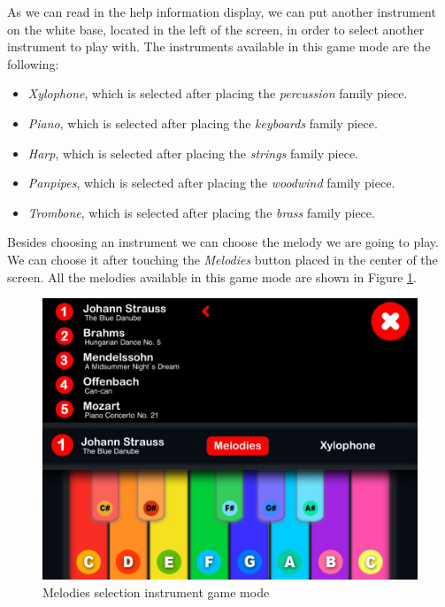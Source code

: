 \FloatBarrier

As we can read in the help information display, we can put another instrument on the white base, located in the left of the screen, in order to select another instrument to play with. The instruments available in this game mode are the following:
\begin{itemize}
\item \textit{Xylophone}, which is selected after placing the \textit{percussion} family piece.
\item \textit{Piano}, which is selected after placing the \textit{keyboards} family piece.
\item \textit{Harp}, which is selected after placing the \textit{strings} family piece.
\item \textit{Panpipes}, which is selected after placing the \textit{woodwind} family piece.
\item \textit{Trombone}, which is selected after placing the \textit{brass} family piece.
\end{itemize}

Besides choosing an instrument we can choose the melody we are going to play. We can choose it after touching the \textit{Melodies} button placed in the center of the screen. All the melodies available in this game mode are shown in Figure \ref{fig:melodies_playing_screen}.

\begin{figure}[ht!]
	\centering
	\includegraphics[width=400pt]{graphics/use-case/melodies_playing_screen.jpg}
	\caption{Melodies selection instrument game mode}
	\label{fig:melodies_playing_screen}
\end{figure}

